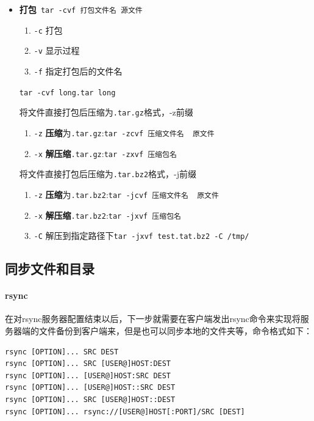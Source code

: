 \documentclass[UTF8,a4paper,12pt]{ctexbook}
\begin{document}
\begin{itemize}
					\item \textbf{打包}\verb| tar -cvf 打包文件名 源文件|
						\begin{enumerate}
							\item \verb|-c| 打包
							\item \verb|-v| 显示过程
							\item \verb|-f| 指定打包后的文件名
						\end{enumerate}
						
						\verb|tar -cvf long.tar long|
						
						将文件直接打包后压缩为\verb|.tar.gz|格式，-z前缀
						\begin{enumerate}
							\item \verb|-z| \textbf{压缩}为\verb|.tar.gz|:\verb|tar -zcvf 压缩文件名  原文件|
							\item \verb|-x| \textbf{解压缩}\verb|.tar.gz|:\verb|tar -zxvf 压缩包名|
						\end{enumerate}
						
						将文件直接打包后压缩为\verb|.tar.bz2|格式，-j前缀
						\begin{enumerate}
							\item \verb|-z| \textbf{压缩}为\verb|.tar.bz2|:\verb|tar -jcvf 压缩文件名  原文件|
							\item \verb|-x| \textbf{解压缩}\verb|.tar.bz2|:\verb|tar -jxvf 压缩包名|
							\item \verb|-C| 解压到指定路径下\verb|tar -jxvf test.tat.bz2 -C /tmp/|
						\end{enumerate}
						
				\end{itemize}
		
		\subsection{同步文件和目录}
			\paragraph{rsync}在对rsync服务器配置结束以后，下一步就需要在客户端发出rsync命令来实现将服务器端的文件备份到客户端来，但是也可以同步本地的文件夹等，命令格式如下：
				\begin{lstlisting}
rsync [OPTION]... SRC DEST
rsync [OPTION]... SRC [USER@]HOST:DEST
rsync [OPTION]... [USER@]HOST:SRC DEST
rsync [OPTION]... [USER@]HOST::SRC DEST
rsync [OPTION]... SRC [USER@]HOST::DEST
rsync [OPTION]... rsync://[USER@]HOST[:PORT]/SRC [DEST]
				\end{lstlisting}
				
\end{document}
